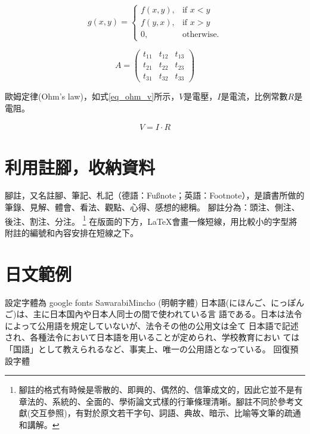 \begin{equation}
   g(x,y) = \left\{\begin{array}{ll}
      f(x,y), & \mbox{if $x<y$} \\  %
      f(y,x), & \mbox{if $x>y$} \\  %
      0,      & \mbox{otherwise.}
     \end{array} \right.
\end{equation}

\begin{equation}
   A =\begin{pmatrix}                %
  t_{11} & t_{12} & t_{13} \\
  t_{21} & t_{22} & t_{23} \\
  t_{31} & t_{32} & t_{33}
   \end{pmatrix}
\end{equation}
\vspace*{3em}

歐姆定律(Ohm's law)，如式\ref{eq_ohm_v}所示，$V$是電壓，$I$是電流，比例常數$R$是電阻。

\begin{equation}\label{eq_ohm_v}
    \begin{split}
        V = I \cdot R
    \end{split}
\end{equation}
\clearpage

\section{利用註腳，收納資料}
腳註，又名註腳、筆記、札記（德語：Fußnote；英語：Footnote），是讀書所做的筆錄、見解、體會、看法、觀點、心得、感想的總稱。
腳註分為：頭注、側注、後注、割注、分注。
\footnote{腳註的格式有時候是零散的、即興的、偶然的、信筆成文的，因此它並不是有章法的、系統的、全面的、學術論文式樣的行筆條理清晰。腳註不同於參考文獻(交互參照)，有對於原文若干字句、詞語、典故、暗示、比喻等文筆的疏通和講解。}
在版面的下方，\LaTeX 會畫一條短線，用比較小的字型將附註的編號和內容安排在短線之下。

\section{日文範例}
設定字體為 google fonts SawarabiMincho (明朝字體) \newline
\mincho
日本語(にほんご、にっぽんご)は、主に日本国內や日本人同士の間で使われている言
語である。日本は法令によって公用語を規定していないが、法令その他の公用文は全て
日本語で記述され、各種法令において日本語を用いることが定められ、学校教育におい
ては「国語」として教えられるなど、事実上、唯一の公用語となっている。
\rmfamily
\newline
回復預設字體

